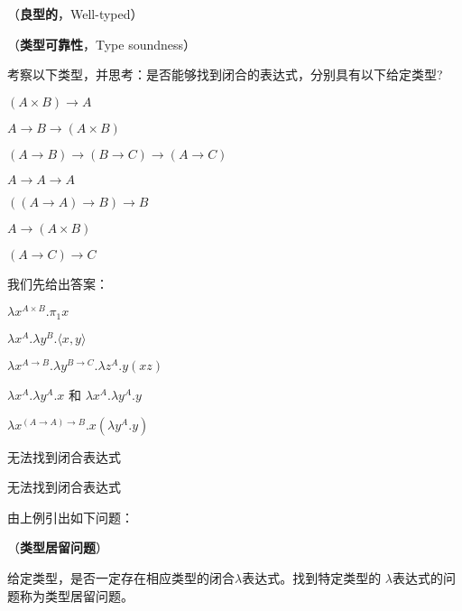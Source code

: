 \begin{defn}（\textbf{良型的}，Well-typed）


\end{defn}


\begin{defn}（\textbf{类型可靠性}，Type soundness）


\end{defn}

\begin{exmp}
考察以下类型，并思考：是否能够找到闭合的表达式，分别具有以下给定类型?

\begin{tightenum}

  \item $( A \times B) \to A$
  \item $A \to B \to (A \times B)$
  \item $(A \to B) \to (B \to C) \to (A \to C)$
  \item $A \to A \to A$
  \item $((A \to A) \to B) \to B$
  \item $A \to (A \times B)$
  \item $(A \to C) \to C$

\end{tightenum}

我们先给出答案：
\begin{tightenum}
  \item $\lambda x^{A \times B}.\pi_1 x$
  \item $\lambda x^A . \lambda y^B . \langle x, y \rangle$
  \item $\lambda x^{A \to B}. \lambda y^{B \to C} . \lambda z^A . y(xz)$
  \item $\lambda x^A . \lambda y^A . x$ 和 $\lambda x^A . \lambda y^A . y$
  \item $\lambda x^{(A \to A) \to B} . x(\lambda y^A . y)$
  \item 无法找到闭合表达式
  \item 无法找到闭合表达式
\end{tightenum}
\end{exmp}

由上例引出如下问题：

\begin{defn} （\textbf{类型居留问题}）

给定类型，是否一定存在相应类型的闭合$\lambda$表达式。找到特定类型的
$\lambda$表达式的问题称为类型居留问题。

\end{defn}



